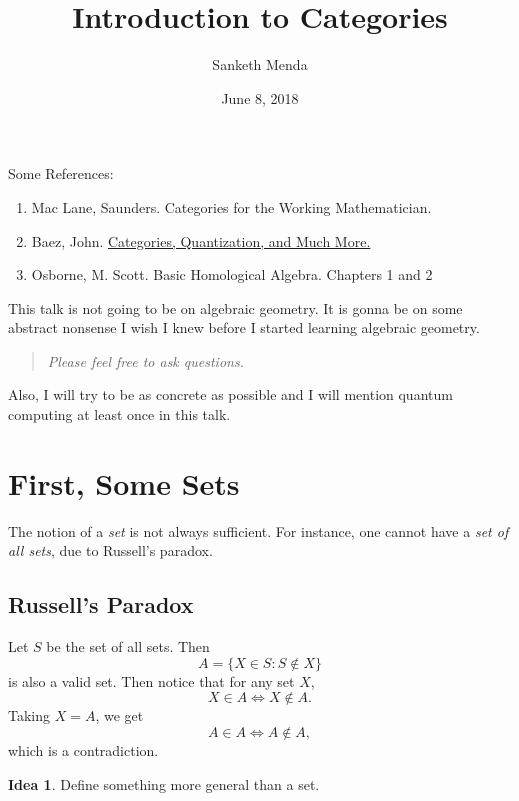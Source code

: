 \documentclass[english,12pt]{article}
\title{Introduction to Categories}
\author{Sanketh Menda}
\date{June 8, 2018}
\theoremstyle{definition}
\newtheorem*{idea}{Idea}
\begin{document}
\maketitle

Some References:
\begin{enumerate}
\item Mac Lane, Saunders. Categories for the Working Mathematician.
\item Baez, John.
  \href{http://www.math.ucr.edu/home/baez/categories.html}{Categories,
    Quantization, and Much More.}
\item Osborne, M. Scott. Basic Homological Algebra. Chapters 1 and 2
\end{enumerate}

This talk is not going to be on algebraic geometry. It is gonna be on some
abstract nonsense I wish I knew before I started learning algebraic
geometry. 

\begin{quote}\itshape
  Please feel free to ask questions.
\end{quote}

Also, I will try to be as concrete as possible and I will mention quantum
computing at least once in this talk.

\section{First, Some Sets}

The notion of a \emph{set} is not always sufficient. For instance, one
cannot have a \emph{set of all sets}, due to Russell's paradox.

\subsection{Russell's Paradox}

Let $S$ be the set of all sets. Then
\begin{equation}
  A = \{X \in S: S \not\in X\}
\end{equation}
is also a valid set. Then notice that for any set $X$,
\begin{equation}
  X \in A \iff X \not\in A.
\end{equation}
Taking $X = A$, we get
\begin{equation}
  A \in A \iff A \not\in A,
\end{equation}
which is a contradiction.

\begin{idea}
  Define something more general than a set.
\end{idea}
\end{document}
